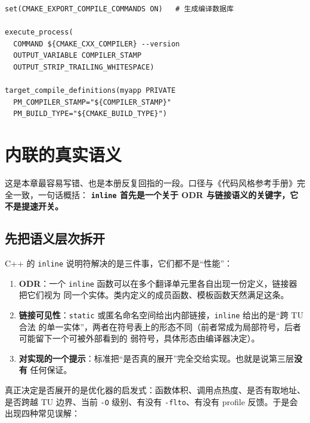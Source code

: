 \documentclass[12pt,a4paper,fontset=fandol]{ctexbook}
\newcommand{\Tp}[1]{\texttt{#1}}
\newcommand{\Lang}[1]{\textsf{#1}}
\newcommand{\CPP}{\Lang{C++}}
\begin{document}
\begin{lstlisting}[style=cmakestyle,title={导出编译数据库并把编译器版本写进产物},label={lst:pm10-cmake}]
set(CMAKE_EXPORT_COMPILE_COMMANDS ON)   # 生成编译数据库

execute_process(
  COMMAND ${CMAKE_CXX_COMPILER} --version
  OUTPUT_VARIABLE COMPILER_STAMP
  OUTPUT_STRIP_TRAILING_WHITESPACE)

target_compile_definitions(myapp PRIVATE
  PM_COMPILER_STAMP="${COMPILER_STAMP}"
  PM_BUILD_TYPE="${CMAKE_BUILD_TYPE}")
\end{lstlisting}

\section{内联的真实语义}
\label{sec:pm10-inline}

这是本章最容易写错、也是本册反复回指的一段。口径与《代码风格参考手册》完全一致，一句话概括：
\textbf{\Tp{inline} 首先是一个关于 ODR 与链接语义的关键字，它不是提速开关。}

\subsection{先把语义层次拆开}

\CPP{} 的 \Tp{inline} 说明符解决的是三件事，它们都不是``性能''：

\begin{enumerate}
  \item \textbf{ODR}：一个 \Tp{inline} 函数可以在多个翻译单元里各自出现一份定义，链接器把它们视为
        同一个实体。类内定义的成员函数、模板函数天然满足这条。
  \item \textbf{链接可见性}：\Tp{static} 或匿名命名空间给出内部链接，\Tp{inline} 给出的是``跨 TU 合法
        的单一实体''，两者在符号表上的形态不同（前者常成为局部符号，后者可能留下一个可被外部看到的
        弱符号，具体形态由编译器决定）。
  \item \textbf{对实现的一个提示}：标准把``是否真的展开''完全交给实现。也就是说第三层\textbf{没有}
        任何保证。
\end{enumerate}

真正决定是否展开的是优化器的启发式：函数体积、调用点热度、是否有取地址、是否跨越 TU 边界、当前
\Tp{-O} 级别、有没有 \Tp{-flto}、有没有 profile 反馈。于是会出现四种常见误解：
\end{document}
